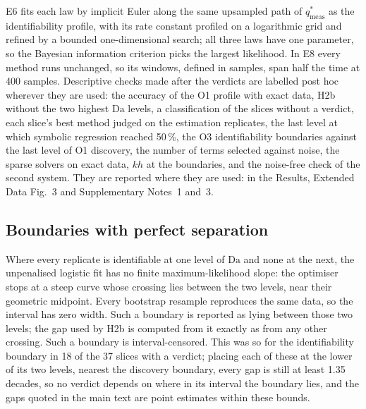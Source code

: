 \documentclass[11pt]{article}
\newcommand{\Da}{\mathrm{Da}}
\newcommand{\qsm}{q^{*}_{\mathrm{meas}}}
\begin{document}
E6 fits each law by implicit Euler along the same upsampled path
of $\qsm$ as the identifiability profile, with its rate constant profiled on a logarithmic grid
and refined by a bounded one-dimensional search; all three laws have one parameter, so the
Bayesian information criterion picks the largest likelihood. In E8 every method runs unchanged,
so its windows, defined in samples, span half the time at 400 samples. Descriptive checks made
after the verdicts are labelled post hoc wherever they are used: the accuracy of the O1 profile with
exact data, H2b without the two highest $\Da$ levels, a classification of the slices without a
verdict, each slice's best method judged on the estimation replicates, the last level at which
symbolic regression reached 50\,\%, the O3 identifiability
boundaries against the last level of O1 discovery, the number of terms selected against noise, the sparse
solvers on exact data, $kh$ at the boundaries, and the noise-free check of the second system. They are
reported where they are used: in the Results, Extended Data Fig.~3 and Supplementary Notes~1 and~3.

\subsection*{Boundaries with perfect separation}
Where every replicate is identifiable at one level of $\Da$ and none at the next, the
unpenalised logistic fit has no finite maximum-likelihood slope: the optimiser stops at a
steep curve whose crossing lies between the two levels, near their geometric midpoint. Every
bootstrap resample reproduces the same data, so the interval has zero width. Such a boundary
is reported as lying between those two levels; the gap used by H2b is computed from it exactly
as from any other crossing. Such a boundary is interval-censored. This was so for the
identifiability boundary in 18 of the 37 slices with a verdict; placing each of these at the
lower of its two levels, nearest the discovery boundary, every gap is still at least 1.35
decades, so no verdict depends on where in its interval the boundary lies, and the gaps quoted
in the main text are point estimates within these bounds.
\end{document}
